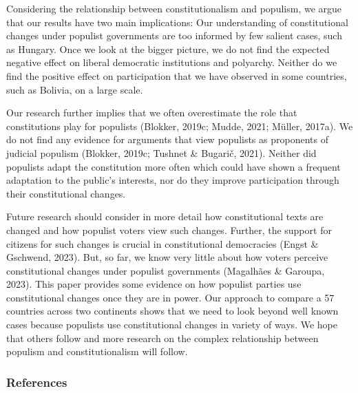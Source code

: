 \documentclass[
  abstract]{article}
\begin{document}
Considering the relationship between constitutionalism and populism, we
argue that our results have two main implications: Our understanding of
constitutional changes under populist governments are too informed by
few salient cases, such as Hungary. Once we look at the bigger picture,
we do not find the expected negative effect on liberal democratic
institutions and polyarchy. Neither do we find the positive effect on
participation that we have observed in some countries, such as Bolivia,
on a large scale.

Our research further implies that we often overestimate the role that
constitutions play for populists (Blokker, 2019c; Mudde, 2021; Müller,
2017a). We do not find any evidence for arguments that view populists as
proponents of judicial populism (Blokker, 2019c; Tushnet \& Bugarič,
2021). Neither did populists adapt the constitution more often which
could have shown a frequent adaptation to the public's interests, nor do
they improve participation through their constitutional changes.

Future research should consider in more detail how constitutional texts
are changed and how populist voters view such changes. Further, the
support for citizens for such changes is crucial in constitutional
democracies (Engst \& Gschwend, 2023). But, so far, we know very little
about how voters perceive constitutional changes under populist
governments (Magalhães \& Garoupa, 2023). This paper provides some
evidence on how populist parties use constitutional changes once they
are in power. Our approach to compare a 57 countries across two
continents shows that we need to look beyond well known cases because
populists use constitutional changes in variety of ways. We hope that
others follow and more research on the complex relationship between
populism and constitutionalism will follow.

\hypertarget{references}{%
\subsubsection{References}\label{references}}
\end{document}
